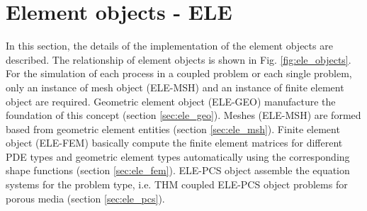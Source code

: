 \section{Element objects - ELE}

In this section, the details of the implementation of the element 
objects are described. The relationship of element objects is shown 
in Fig. \ref{fig:ele_objects}. For the simulation of each process in 
a coupled problem or each single problem, only an instance of  mesh 
object (ELE-MSH) and an instance of finite element object are 
required. Geometric element object (ELE-GEO) manufacture the 
foundation of this concept (section \ref{sec:ele_geo}). Meshes 
(ELE-MSH) are formed based from geometric element entities (section 
\ref{sec:ele_msh}). Finite element object (ELE-FEM) basically 
compute the finite element matrices for different PDE types and 
geometric element types automatically  using the corresponding shape 
functions (section \ref{sec:ele_fem}).  ELE-PCS object assemble the 
equation systems for the problem type, i.e. THM coupled ELE-PCS 
object problems for porous media (section \ref{sec:ele_pcs}). 
